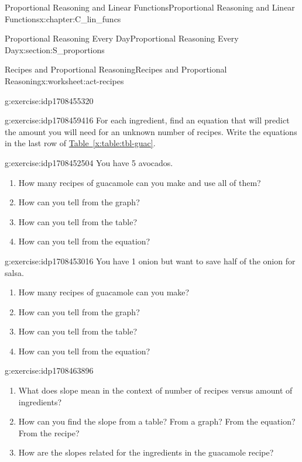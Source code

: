 \documentclass[oneside,10pt,]{book}
\newcommand{\xreffont}{\relax}
\numberwithin{equation}{chapter}
\begin{document}
\begin{chapterptx}{Proportional Reasoning and Linear Functions}{}{Proportional Reasoning and Linear Functions}{}{}{x:chapter:C_lin_funcs}
\begin{sectionptx}{Proportional Reasoning Every Day}{}{Proportional Reasoning Every Day}{}{}{x:section:S_proportions}
\begin{worksheet-subsection}{Recipes and Proportional Reasoning}{}{Recipes and Proportional Reasoning}{}{}{x:worksheet:act-recipes}
\begin{divisionexercise}{5}{}{}{g:exercise:idp1708455320}
\end{divisionexercise}%
\begin{divisionexercise}{6}{}{}{g:exercise:idp1708459416}%
For each ingredient, find an equation that will predict the amount you will need for an unknown number of recipes. Write the equations in the last row of \hyperref[x:table:tbl-guac]{Table~{\xreffont\ref{x:table:tbl-guac}}}.%
\end{divisionexercise}%
\begin{divisionexercise}{7}{}{}{g:exercise:idp1708452504}%
You have 5 avocados.%
\begin{enumerate}[font=\bfseries,label=(\alph*),ref=\alph*]
\item{}How many recipes of guacamole can you make and use all of them?%
\item{}How can you tell from the graph?%
\item{}How can you tell from the table?%
\item{}How can you tell from the equation?%
\end{enumerate}
\end{divisionexercise}%
\begin{divisionexercise}{8}{}{}{g:exercise:idp1708453016}%
You have 1 onion but want to save half of the onion for salsa.%
\begin{enumerate}[font=\bfseries,label=(\alph*),ref=\alph*]
\item{}How many recipes of guacamole can you make?%
\item{}How can you tell from the graph?%
\item{}How can you tell from the table?%
\item{}How can you tell from the equation?%
\end{enumerate}
\end{divisionexercise}%
\begin{divisionexercise}{9}{}{}{g:exercise:idp1708463896}%
\begin{enumerate}[font=\bfseries,label=(\alph*),ref=\alph*]
\item{}What does slope mean in the context of number of recipes versus amount of ingredients?%
\item{}How can you find the slope from a table? From a graph? From the equation? From the recipe?%
\item{}How are the slopes related for the ingredients in the guacamole recipe?%
\end{enumerate}
\end{divisionexercise}%
\end{worksheet-subsection}

\end{sectionptx}
\end{chapterptx}
\end{document}
